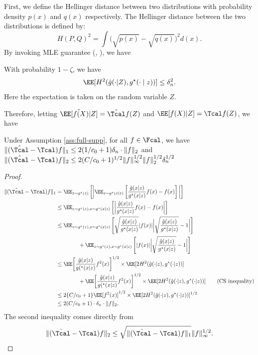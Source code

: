 \documentclass[12pt]{extarticle} %
\begin{document}
First, we define the Hellinger distance between two distributions with probability density $p(x)$ and $q(x)$ respectively. The Hellinger distance between the two distributions is defined by: $$
H(P, Q)^2 = \int \big(\sqrt{p(x)} - \sqrt{q(x)}\big)^2 d(x).
$$
By invoking MLE guarantee (\citet[Theorem 21]{agarwal2020flambe}, \citet[Theorem 3.3]{ge2023provable}), we have 
\begin{lemma}
With probability $1-\zeta$, we have 
\begin{align*}
    \EE[H^2(\hat g(\cdot |Z),g^{\star}(\cdot \mid z))]\leq \delta^2_n. 
\end{align*}
Here the expectation is taken on the random variable $Z$.
\end{lemma}
Therefore, letting  $\hat \EE[f(X)|Z]=\hat \Tcal f(Z)$ and $\EE[f(X)|Z]=\Tcal f(Z)$, we have 
\begin{lemma}\label{lem:appro}
Under Assumption \ref{ass:full-supp}, for all $f\in\Fcal  $, we have  $ \|(\hat \Tcal-\Tcal)f\|_1\leq   2(1/c_0 +1)\delta_n \cdot\|f\|_2$ and $\|(\hat \Tcal-\Tcal)f\|_2 \leq 2(C/c_0 +1)^{1/2}\|f\|_{\infty}^{1/2}\|f\|_{2}^{1/2} \delta_n^{1/2}$
\end{lemma}
\begin{proof}
\begin{align*}
   \|(\hat \Tcal-\Tcal)f\|_1  &= \EE_{z \sim g^{\star}(z)}\left[\bigg|\EE_{x \sim g^{\star}(x|z)}\left [\frac{\hat g(x|z)}{g^{\star}(x|z)}f(x) - f(x) \right] \bigg| \right]\\
    &\leq \EE_{z \sim g^{\star}(z),x \sim g^{\star}(x|z)}\left[ \bigg|\frac{\hat g(x|z)}{g^{\star}(x|z)}f(x) - f(x)  \bigg| \right]\\
    &\leq \EE_{z \sim g^{\star}(z),x \sim g^{\star}(x|z)}\left[\sqrt{\frac{\hat g(x|z)}{g^{\star}(x|z)}}|f(x)| \bigg|\sqrt{\frac{\hat g(x|z)}{g^{\star}(x|z)}} - 1 \bigg|\right] \\
    &\qquad\qquad+ \EE_{z \sim g^{\star}(z),x \sim g^{\star}(x|z)}\left[|f(x)|\bigg|\sqrt{\frac{\hat g(x|z)}{g^{\star}(x|z)}} - 1  \bigg|\right] \\
    &\leq \EE\bigg[\frac{\hat g(x|z)}{g(^{\star}(x|z)}f^2(x) \bigg]^{1/2} \times \EE[2H^2(\hat g(\cdot|z),g^{\star}(\cdot |z))  ]\\
    &\qquad\qquad+\EE\bigg[\frac{\hat g(x|z)}{g(^{\star}(x|z)}f^2(x) \bigg]^{1/2} \times \EE[2H^2(\hat g(\cdot|z),g^{\star}(\cdot |z))  ] \tag{CS inequality} \\
    &\leq  2\{C/c_0+1\} \EE[f^2(x) ]^{1/2} \times \EE[2H^2(\hat g(\cdot|z),g^{\star}(\cdot |z))  ]^{1/2}\\
    &\leq 2(C/c_0 +1)\cdot\delta_n \cdot\|f\|_2 .
\end{align*} 
The second inequality comes directly from $$
\|(\hat{\Tcal}-  \Tcal)f\|_2 \leq \sqrt{\|(\hat{\Tcal}-  \Tcal)f\|_1} \|f\|_\infty^{1/2}.
$$
\end{proof}
\end{document}
